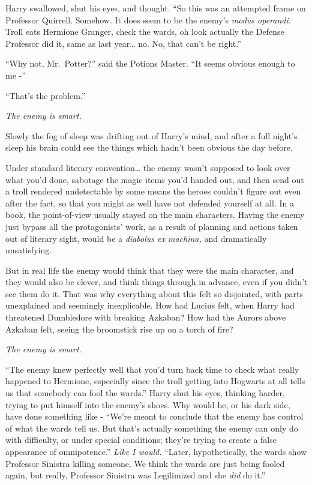 Harry swallowed, shut his eyes, and thought. ``So this was an attempted
frame on Professor Quirrell. Somehow. It does seem to be the enemy's
\emph{modus operandi.} Troll eats Hermione Granger, check the wards, oh
look actually the Defense Professor did it, same as last year\ldots{}
no. No, that can't be right.''

``Why not, Mr.~Potter?'' said the Potions Master. ``It seems obvious
enough to me -''

``That's the problem.''

\emph{The enemy is smart.}

Slowly the fog of sleep was drifting out of Harry's mind, and after a
full night's sleep his brain could see the things which hadn't been
obvious the day before.

Under standard literary convention\ldots{} the enemy wasn't supposed to
look over what you'd done, sabotage the magic items you'd handed out,
and then send out a troll rendered undetectable by some means the heroes
couldn't figure out even after the fact, so that you might as well have
not defended yourself at all. In a book, the point-of-view usually
stayed on the main characters. Having the enemy just bypass all the
protagonists' work, as a result of planning and actions taken out of
literary sight, would be a \emph{diabolus ex machina,} and dramatically
unsatisfying.

But in real life the enemy would think that they were the main
character, and they would also be clever, and think things through in
advance, even if you didn't see them do it. That was why everything
about this felt so disjointed, with parts unexplained and seemingly
inexplicable. How had Lucius felt, when Harry had threatened Dumbledore
with breaking Azkaban? How had the Aurors above Azkaban felt, seeing the
broomstick rise up on a torch of fire?

\emph{The enemy is smart.}

``The enemy knew perfectly well that you'd turn back time to check what
really happened to Hermione, especially since the troll getting into
Hogwarts at all tells us that somebody can fool the wards.'' Harry shut
his eyes, thinking harder, trying to put himself into the enemy's shoes.
Why would he, or his dark side, have done something like - ``We're meant
to conclude that the enemy has control of what the wards tell us. But
that's actually something the enemy can only do with difficulty, or
under special conditions; they're trying to create a false appearance of
omnipotence.'' \emph{Like I would.} ``Later, hypothetically, the wards
show Professor Sinistra killing someone. We think the wards are just
being fooled again, but really, Professor Sinistra was Legilimized and
she \emph{did} do it.''

